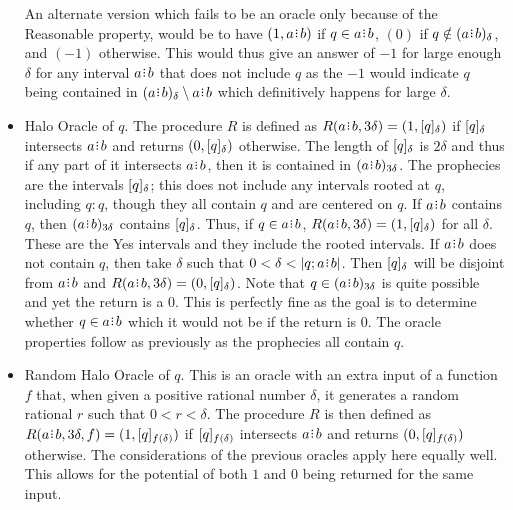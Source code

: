 \documentclass[12pt]{article}
\begin{document}
\begin{itemize}
    
    An alternate version which fails to be an oracle only because of the Reasonable property, would be to have $(1, a\rint b)$ if $q \in a \rint b$, $(0)$ if $q \notin \halo{a \rint b}$, and $(-1)$ otherwise. This would thus give an answer of $-1$ for large enough $\delta$ for any interval $a \rint b$ that does not include $q$ as the $-1$ would indicate $q$ being contained in $\halo{a \rint b} \setminus a \rint b$ which definitively happens for large $\delta$. 
    
    \item Halo Oracle of $q$. The procedure $R$ is defined as $R(a\rint b, 3\delta) = (1, \clhalo{q})$ if $\clhalo{q}$ intersects $a\rint b$ and returns $(0, \clhalo{q})$ otherwise. The length of $\clhalo{q}$ is $2\delta$ and thus if any part of it intersects $a \rint b$, then it is contained in $\halo[3\delta]{a \rint b}$. The prophecies are the intervals $\clhalo{q}$; this does not include any intervals rooted at $q$, including $q:q$, though they all contain $q$ and are centered on $q$. If $a \rint b$ contains $q$, then $\halo[3 \delta]{a \rint b}$ contains $\clhalo{q}$. Thus, if $q \in a \rint b$, $R(a \rint b, 3\delta) = (1, \clhalo{q})$ for all $\delta$. These are the Yes intervals and they include the rooted intervals. If $a \rint b$ does not contain $q$, then take $\delta$ such that $0 < \delta < |q; a \rint b|$. Then $\clhalo{q}$ will be disjoint from $a \rint b$ and $R(a \rint b, 3\delta) = (0, \clhalo{q})$. Note that $q \in \halo[3\delta]{a \rint b}$ is quite possible and yet the return is a $0$. This is perfectly fine as the goal is to determine whether $q \in a \rint b$ which it would not be if the return is 0. The oracle properties follow as previously as the prophecies all contain $q$. 
    
    \item Random Halo Oracle of $q$. This is an oracle with an extra input of a function $f$ that, when given a positive rational number $\delta$, it generates a random rational $r$ such that $0 < r < \delta$. The procedure $R$ is then defined as $R(a\rint b, 3\delta, f) = (1, \clhalo[f(\delta)]{q})$ if $\clhalo[f(\delta)]{q}$ intersects $a\rint b$ and returns $(0, \clhalo[f(\delta)]{q})$ otherwise. The considerations of the previous oracles apply here equally well. This allows for the potential of both $1$ and $0$ being returned for the same input. 
    

\end{itemize}
\end{document}
